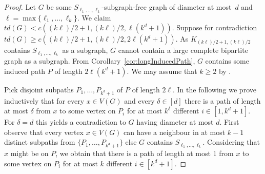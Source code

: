 \documentclass[runningheads,envcountsame]{llncs}
\newcommand{\subdivStar}[1]{S_{#1}}
\begin{document}
\begin{proof}
    Let $G$ be some $\subdivStar{\ell_1, \ldots , \ell_k}$-subgraph-free graph of diameter at most~$d$ and $\ell = \max\{\ell_1, \ldots , \ell_k\}$. We claim $td(G) < c((k\ell)/2+1, (k\ell)/2, \ell(k^d+1))$. Suppose for contradiction $td(G) \geq c((k\ell)/2+1, (k\ell)/2, 2\ell(k^d+1))$. As $K_{(k\ell)/2+1, (k\ell)/2}$ contains $\subdivStar{\ell_1, \ldots , \ell_k}$ as a subgraph, $G$ cannot contain a large complete bipartite graph as a subgraph. From Corollary~\ref{cor:longInducedPath}, $G$ contains some induced path $P$ of length $2\ell(k^d+1)$. We may assume that  $k \geq 2$ by .

    Pick disjoint subpaths $P_1,\ldots,P_{k^d+1}$ of $P$ of length $2\ell$. 
    In the following we prove inductively that for every $x\in V(G)$ and every $\delta\in [d]$ there is a path of length at most $\delta$ from $x$ to some vertex on $P_i$ for at most $k^\delta$ different $i\in [1,k^d+1]$. For $\delta=d$ this yields a contradiction to $G$ having diameter at most $d$.
    First observe that every vertex $x \in V(G)$ can have a neighbour in at most $k-1$ distinct subpaths from $\{P_1,\dots, P_{k^d+1}\}$ else $G$ contains $\subdivStar{\ell_1, \ldots , \ell_k}$. Considering that $x$ might be on $P$, we obtain that there is a path of length at most $1$ from $x$ to some vertex on $P_i$ for at most $k$ different $i\in [k^d+1]$.  
    

\end{proof}
\end{document}
